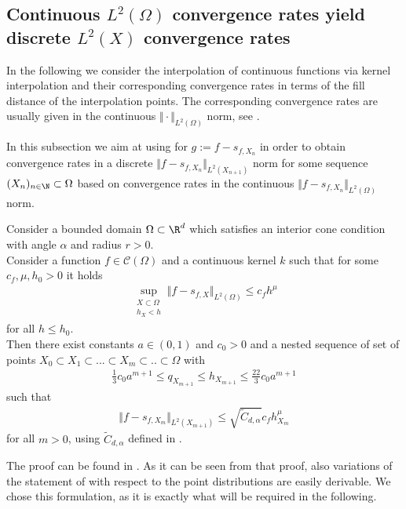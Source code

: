 \documentclass[a4paper, 10pt]{article}
\begin{document}
%
%
%
%

\subsection{Continuous $L^2(\Omega)$ convergence rates yield discrete $L^2(X)$ convergence rates}

In the following we consider the interpolation of continuous functions via kernel interpolation and their corresponding convergence rates in terms of the fill distance of the interpolation points.
The corresponding convergence rates are usually given in the continuous $\Vert \cdot \Vert_{L^2(\Omega)}$ norm, see .

In this subsection we aim at using  for $g := f - s_{f, X_n}$ in order to obtain convergence rates in a discrete $\Vert f - s_{f, X_n} \Vert_{L^2(X_{n+1})}$ norm for some sequence $(X_n)_{n \in \N} \subset \Omega$ based on convergence rates in the continuous $\Vert f - s_{f, X_n} \Vert_{L^2(\Omega)}$ norm.

\begin{prop}
\label{prop:disc_L2_from_cont_L2_new}
%
Consider a bounded domain $\Omega \subset \R^d$ which satisfies an interior cone condition with angle $\alpha$ and radius $r>0$. \\
Consider a function $f \in \mathcal{C}(\Omega)$ and a continuous kernel $k$ such that for some $c_f, \mu, h_0 > 0$ it holds
\begin{align*}
\sup_{\substack{X \subset \Omega \\ h_X < h}} \Vert f - s_{f, X} \Vert_{L^2(\Omega)} \leq c_f h^{\mu}
\end{align*}
%
%
%
%
for all $h \leq h_0$. \\
Then there exist constants $a \in (0, 1)$ and $c_0 > 0$ and a nested sequence of set of points $X_0 \subset X_1 \subset ... \subset X_m \subset .. \subset \Omega$ with 
\begin{align*}
\frac{1}{3} c_0 a^{m+1} \leq q_{X_{m+1}} \leq h_{X_{m+1}} \leq \frac{22}{3} c_0 a^{m+1}
\end{align*}
%
%
%
%
such that
\begin{align*}
\Vert f - s_{f, X_m} \Vert_{L^2(X_{m+1})} \leq \sqrt{\tilde{C}_{d,\alpha}} c_f h_{X_m}^{\mu}
\end{align*}
for all $m > 0$, using $\tilde{C}_{d,\alpha}$ defined in .
\end{prop}

The proof can be found in .
As it can be seen from that proof, also variations of the statement of  with respect to the point distributions are easily derivable. 
We chose this formulation, as it is exactly what will be required in the following. \\
%
\end{document}
